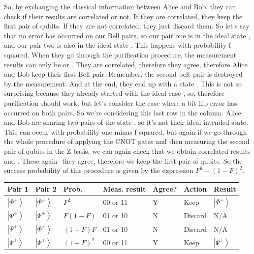 So, by exchanging the classical information between Alice and Bob, they can check if their results are correlated or not. If they are correlated, they keep the first pair of qubits. If they are not correlated, they just discard them. So let's say that no error has occurred on our Bell pairs, so our pair one is in the ideal state  \ket{\Phi^+}, and our pair two is also in the ideal state  \ket{\Phi^+}. This happens with probability f squared. When they go through the purification procedure, the measurement results can only be  or . They are correlated, therefore they agree, therefore Alice and Bob keep their first Bell pair. Remember, the second belt pair is destroyed by the measurement. And at the end, they end up with a state  \ket{\Phi^+}. This is not so surprising because they already started with the ideal case  \ket{\Phi^+}, so, therefore purification should work, but let's consider the case where a bit flip error has occurred on both pairs. So we're considering this last row in the column. Alice and Bob are sharing two pairs of the state \PsiPlus, so it's not their ideal intended state. This can occur with probability one minus f squared, but again if we go through the whole procedure of applying the CNOT gates and then measuring the second pair of qubits in the Z basis, we can again check that we obtain correlated results  and . These again- they agree, therefore we keep the first pair of qubits. So the success probability of this procedure is given by the expression $F^2+(1-F)^2$.

\begin{tabular}{|l|l|l|l|l|l|l|}
\hline Pair 1 & Pair 2 & Prob. & Meas. result & Agree? & Action & Result \\
\hline$\left|\Phi^{+}\right\rangle$ & $\left|\Phi^{+}\right\rangle$ & $F^{2}$ & 00 or 11 & Y & Keep & $\left|\Phi^{+}\right\rangle$ \\
\hline$\left|\Phi^{+}\right\rangle$ & $\left|\Psi^{+}\right\rangle$ & $F(1-F)$ & 01 or 10 & N & Discard & N/A \\
\hline$\left|\Psi^{+}\right\rangle$ & $\left|\Phi^{+}\right\rangle$ & $(1-F) F$ & 01 or 10 & N & Discard & N/A \\
\hline$\left|\Psi^{+}\right\rangle$ & $\left|\Psi^{+}\right\rangle$ & $(1-F)^{2}$ & 00 or 11 & Y & Keep & $\left|\Psi^{+}\right\rangle$ \\
\hline
\end{tabular}

